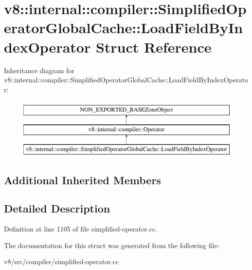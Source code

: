 \hypertarget{structv8_1_1internal_1_1compiler_1_1SimplifiedOperatorGlobalCache_1_1LoadFieldByIndexOperator}{}\section{v8\+:\+:internal\+:\+:compiler\+:\+:Simplified\+Operator\+Global\+Cache\+:\+:Load\+Field\+By\+Index\+Operator Struct Reference}
\label{structv8_1_1internal_1_1compiler_1_1SimplifiedOperatorGlobalCache_1_1LoadFieldByIndexOperator}
Inheritance diagram for v8\+:\+:internal\+:\+:compiler\+:\+:Simplified\+Operator\+Global\+Cache\+:\+:Load\+Field\+By\+Index\+Operator\+:\begin{figure}[H]
\begin{center}
\leavevmode
\includegraphics[height=3.000000cm]{structv8_1_1internal_1_1compiler_1_1SimplifiedOperatorGlobalCache_1_1LoadFieldByIndexOperator}
\end{center}
\end{figure}
\subsection*{Additional Inherited Members}


\subsection{Detailed Description}


Definition at line 1105 of file simplified-\/operator.\+cc.



The documentation for this struct was generated from the following file\+:\begin{DoxyCompactItemize}
\item 
v8/src/compiler/simplified-\/operator.\+cc\end{DoxyCompactItemize}
